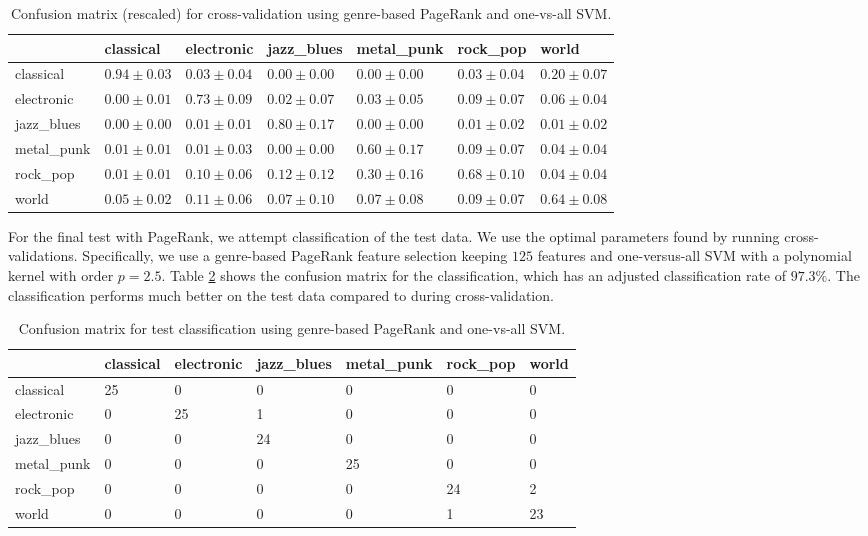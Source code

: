 \documentclass[12pt]{article}
\begin{document}
\begin{table}[h!]
   \centering
   \begin{tabular}{ l||l | l | l | l | l | l | }
   & classical& electronic& jazz\_blues& metal\_punk& rock\_pop& world\\\hline
   classical & $0.94 \pm0.03$ &$0.03 \pm0.04$ &$0.00 \pm0.00$ &$0.00 \pm0.00$ &$0.03 \pm0.04$ &$0.20 \pm0.07$ \\ \hline 
   electronic & $0.00 \pm0.01$ &$0.73 \pm0.09$ &$0.02 \pm0.07$ &$0.03 \pm0.05$ &$0.09 \pm0.07$ &$0.06 \pm0.04$ \\ \hline 
   jazz\_blues & $0.00 \pm0.00$ &$0.01 \pm0.01$ &$0.80 \pm0.17$ &$0.00 \pm0.00$ &$0.01 \pm0.02$ &$0.01 \pm0.02$ \\ \hline 
   metal\_punk & $0.01 \pm0.01$ &$0.01 \pm0.03$ &$0.00 \pm0.00$ &$0.60 \pm0.17$ &$0.09 \pm0.07$ &$0.04 \pm0.04$ \\ \hline 
   rock\_pop & $0.01 \pm0.01$ &$0.10 \pm0.06$ &$0.12 \pm0.12$ &$0.30 \pm0.16$ &$0.68 \pm0.10$ &$0.04 \pm0.04$ \\ \hline 
   world & $0.05 \pm0.02$ &$0.11 \pm0.06$ &$0.07 \pm0.10$ &$0.07 \pm0.08$ &$0.09 \pm0.07$ &$0.64 \pm0.08$ \\ \hline 
   \end{tabular}
   \caption{Confusion matrix (rescaled) for cross-validation using genre-based PageRank and one-vs-all SVM.}
   \label{tab:xval}
\end{table}

For the final test with PageRank, we attempt classification of the test data.  We use the optimal parameters found by running cross-validations.  Specifically, we use a genre-based PageRank feature selection keeping $125$ features and one-versus-all SVM with a polynomial kernel with order $p=2.5$.  Table \ref{tab:class} shows the confusion matrix for the classification, which has an adjusted classification rate of $97.3\%$.  The classification performs much better on the test data compared to during cross-validation.

\begin{table}[h!]
   \centering
   \begin{tabular}{ l||l | l | l | l | l | l | }
   & classical & electronic & jazz\_blues & metal\_punk & rock\_pop & world\\\hline
   classical & 25 &0 &0 &0 &0 &0 \\ \hline 
   electronic & 0 &25 &1 &0 &0 &0 \\ \hline 
   jazz\_blues & 0 &0 &24 &0 &0 &0 \\ \hline 
   metal\_punk & 0 &0 &0 &25 &0 &0 \\ \hline 
   rock\_pop & 0 &0 &0 &0 &24 &2 \\ \hline 
   world & 0 &0 &0 &0 &1 &23 \\ \hline 
   \end{tabular}
   \caption{Confusion matrix for test classification using genre-based PageRank and one-vs-all SVM.}
   \label{tab:class}
\end{table}
\end{document}
